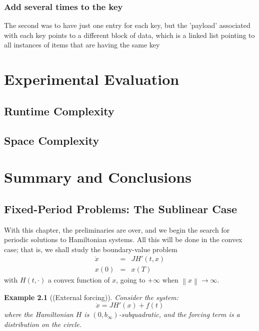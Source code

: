 \documentclass[abstracton,12pt]{scrreprt}
\newtheorem{example}{Example}
\begin{document}
\subsection{Add several times to the key}

The second was to have just one entry for each key, but the 'payload' associated with each key points to a different block of data, which is a linked list pointing to all instances of items that are having the same key





\chapter{Experimental Evaluation}

\section{Runtime Complexity}
\section{Space Complexity}

\chapter{Summary and Conclusions}

\section{Fixed-Period Problems: The Sublinear Case}

With this chapter, the preliminaries are over, and we begin the search
for periodic solutions to Hamiltonian systems. All this will be done
in the convex case; that is, we shall study the boundary-value problem
\begin{eqnarray*}
  \dot{x}&=&JH' (t,x)\\
  x(0) &=& x(T)
\end{eqnarray*}
with $H(t,\cdot)$ a convex function of $x$, going to $+\infty$ when
$\left\|x\right\| \to \infty$.

\begin{example} [{\rm(External forcing)}]
Consider the system:
\begin{equation}
  \dot{x} = JH' (x) + f(t)
\end{equation}
where the Hamiltonian $H$ is $\left(0,b_{\infty}\right)$-subquadratic,
and the forcing term is a distribution on the circle.
\end{example}
\end{document}
